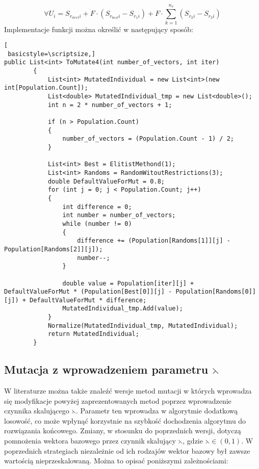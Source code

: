 $$
 \forall U_{i} = S_{r_{itert}i} +  F \cdot (S_{r_{best}i} - S_{r_{1}i}) +  F \cdot \sum_{k=1}^{n_{v}}(S_{r_{2}i} - S_{r_{3}i})
$$
Implementacje funkcji można określić w następujący sposób:
\begin{program}[h!]
\begin{lstlisting}[
 basicstyle=\scriptsize,]
public List<int> ToMutate4(int number_of_vectors, int iter)
        {
            List<int> MutatedIndividual = new List<int>(new int[Population.Count]);
            List<double> MutatedIndividual_tmp = new List<double>();
            int n = 2 * number_of_vectors + 1;

            if (n > Population.Count)
            {
                number_of_vectors = (Population.Count - 1) / 2;
            }

            List<int> Best = ElitistMethond(1);
            List<int> Randoms = RandomWitoutRestrictions(3);
            double DefaultValueForMut = 0.8;
            for (int j = 0; j < Population.Count; j++)
            {
                int difference = 0;
                int number = number_of_vectors;
                while (number != 0)
                {
                    difference += (Population[Randoms[1]][j] - Population[Randoms[2]][j]);
                    number--;
                }

                double value = Population[iter][j] + DefaultValueForMut * (Population[Best[0]][j] - Population[Randoms[0]][j]) + DefaultValueForMut * difference;
                MutatedIndividual_tmp.Add(value);
            }
            Normalize(MutatedIndividual_tmp, MutatedIndividual);
            return MutatedIndividual;
        }
\end{lstlisting}
\end{program}


\subsection{Mutacja z wprowadzeniem parametru $\leftthreetimes$} \label{sec:narzedzia}

W literaturze \cite{czynnik} można także znaleźć wersje metod mutacji w których wprowadza się modyfikacje powyżej zaprezentowanych metod poprzez wprowadzenie czynnika skalującego $\leftthreetimes$. Parametr ten wprowadza w algorytmie dodatkową losowość, co może wpłynąć korzystnie na szybkość dochodzenia algorytmu do rozwiązania końcowego. Zmiany, w stosunku do poprzednich wersji, dotyczą pomnożenia wektora bazowego przez czynnik skalujący $\leftthreetimes$, gdzie $\leftthreetimes \in (0,1)$. W poprzednich strategiach niezależnie od ich rodzajów wektor bazowy był zawsze wartością nieprzeskalowaną. Można to opisać poniższymi zależnościami:\\

